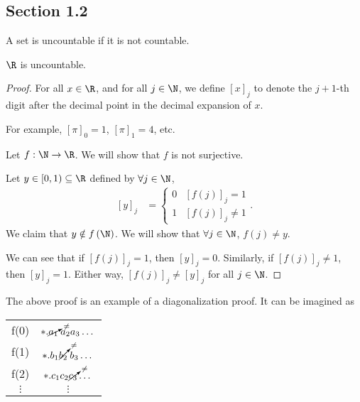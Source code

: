 \documentclass[10pt]{mypackage}
\begin{document}
\subsection{Section 1.2}%
\begin{definition}
A set is uncountable if it is not countable.
\end{definition}
\begin{theorem}[Uncountability of $\R$]
  $\R$ is uncountable.
\end{theorem}
\begin{proof}
  For all $x\in \R$, and for all $j\in\N$, we define $\left[x\right]_j$ to denote the $j+1$-th digit after the decimal point in the decimal expansion of $x$.\newline

  For example, $\left[\pi\right]_0 = 1$, $\left[\pi\right]_1 = 4$, etc.\newline

  Let $f: \N\rightarrow \R$. We will show that $f$ is not surjective.\newline

  Let $y\in [0,1)\subseteq \R$ defined by $\forall j\in \N$,
  \begin{align*}
    \left[y\right]_j &= \begin{cases}
      0 & \left[f(j)\right]_j = 1\\
      1 & \left[f(j)\right]_j \neq 1
    \end{cases}.
  \end{align*}
  We claim that $y\notin f\left(\N\right)$. We will show that $\forall j\in \N$, $f(j) \neq y$.\newline

  We can see that if $\left[f(j)\right]_j = 1$, then $\left[y\right]_j = 0$. Similarly, if $\left[f(j)\right]_j\neq 1$, then $\left[y\right]_j = 1$. Either way, $\left[f(j)\right]_j \neq \left[y\right]_j$ for all $j\in\N$.
\end{proof}
\begin{remark}
The above proof is an example of a diagonalization proof. It can be imagined as
\begin{center}
  \renewcommand{\arraystretch}{1.5}
  \begin{tabular}{c|c}
    f(0) & $\ast.\cancelto{\neq}{a_1}\:a_2a_3\dots$\\
    f(1) & $\ast.b_1\cancelto{\neq}{b_2}\:b_3\dots$\\
    f(2) & $\ast.c_1c_2\cancelto{\neq}{c_3}\dots$\\
    $\vdots$ & $\vdots$
  \end{tabular}
\end{center}
\end{remark}
\end{document}
